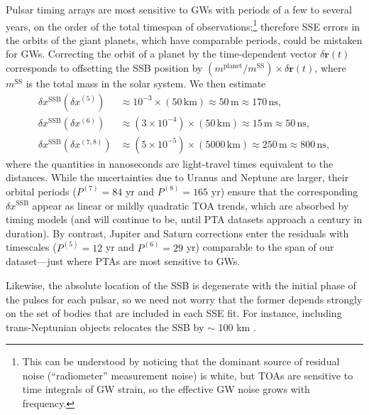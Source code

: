 \documentclass{aastex63}
\begin{document}
Pulsar timing arrays are most sensitive to GWs with periods of a few to several years, on the order of the total timespan of observations;\footnote{This can be understood by noticing that the dominant source of residual noise (``radiometer'' measurement noise) is white, but TOAs are sensitive to time integrals of GW strain, so the effective GW noise grows with frequency.}
therefore SSE errors in the orbits of the giant planets, which have comparable periods, could be mistaken for GWs.
Correcting the orbit of a planet by the time-dependent vector $\delta \mathbf{r}(t)$ corresponds to offsetting the SSB position by $(m^\mathrm{planet}/m^\mathrm{SS}) \times \delta \mathbf{r}(t)$, where $m^\mathrm{SS}$ is the total mass in the solar system. We then estimate
%
\begin{equation}
    \begin{aligned}
    \delta x^\mathrm{SSB}(\delta x^{(5)}) & \approx 10^{-3} \!\times\! (50 \, \mathrm{km}) \approx 50 \, \mathrm{m} \approx 170 \, \mathrm{ns}, \\
    \delta x^\mathrm{SSB}(\delta x^{(6)}) & \approx (3 \!\times\! 10^{-4}) \!\times\! (50 \, \mathrm{km}) \approx 15 \, \mathrm{m} \approx 50 \, \mathrm{ns}, \\
    \delta x^\mathrm{SSB}(\delta x^{(7,8)}) & \approx (5 \!\times\! 10^{-5}) \!\times\! (5000 \, \mathrm{km}) \approx 250 \, \mathrm{m} \approx 800 \, \mathrm{ns},
    \end{aligned}
\end{equation}
%
where the quantities in nanoseconds are light-travel times equivalent to the distances.
While the uncertainties due to Uranus and Neptune are larger, their orbital periods ($P^{(7)} = 84$ yr and $P^{(8)} = 165$ yr) ensure that the corresponding $\delta x^\mathrm{SSB}$ appear as linear or mildly quadratic TOA trends, which are absorbed by timing models (and will continue to be, until PTA datasets approach a century in duration). By contrast, Jupiter and Saturn corrections enter the residuals with timescales ($P^{(5)} = 12$ yr and $P^{(6)} = 29$ yr) comparable to the span of our dataset---just where PTAs are most sensitive to GWs.

Likewise, the absolute location of the SSB is degenerate with the initial phase of the pulses for each pulsar, so we need not worry that the former depends strongly on the set of bodies that are included in each SSE fit. For instance, including trans-Neptunian objects relocates the SSB by $\sim$ 100 km \citep{2014IPNPR.196C...1F}.
\end{document}
